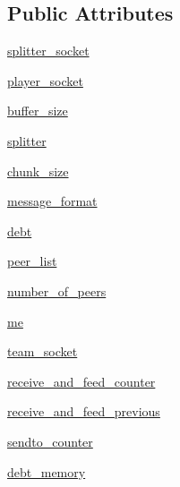 \subsection*{Public Attributes}
\begin{DoxyCompactItemize}
\item 
\hyperlink{classsrc_1_1core_1_1peer__dbs_1_1Peer__DBS_a20f9c699a4f21deb815b18b66a9f0a15}{splitter\+\_\+socket}
\item 
\hyperlink{classsrc_1_1core_1_1peer__dbs_1_1Peer__DBS_ac9c680d2156271762889ca8df74d8729}{player\+\_\+socket}
\item 
\hyperlink{classsrc_1_1core_1_1peer__dbs_1_1Peer__DBS_a40aeb00ce0d74c866a44cae0832cb627}{buffer\+\_\+size}
\item 
\hyperlink{classsrc_1_1core_1_1peer__dbs_1_1Peer__DBS_ac893e7587632b197d5867d72f8665721}{splitter}
\item 
\hyperlink{classsrc_1_1core_1_1peer__dbs_1_1Peer__DBS_a4e59f03402531dff3b8dab83a78ab1a2}{chunk\+\_\+size}
\item 
\hyperlink{classsrc_1_1core_1_1peer__dbs_1_1Peer__DBS_a35425ace8df8bc35ca5ca9d17c46b813}{message\+\_\+format}
\item 
\hyperlink{classsrc_1_1core_1_1peer__dbs_1_1Peer__DBS_a73d19818ef068e8dcb055aa16621e367}{debt}
\item 
\hyperlink{classsrc_1_1core_1_1peer__dbs_1_1Peer__DBS_a8bc92e8755ed4c4f9e4362a80a39991a}{peer\+\_\+list}
\item 
\hyperlink{classsrc_1_1core_1_1peer__dbs_1_1Peer__DBS_ae2066ca8afc595638a2f545c744c77d0}{number\+\_\+of\+\_\+peers}
\item 
\hyperlink{classsrc_1_1core_1_1peer__dbs_1_1Peer__DBS_a305a94f69a6e54994164fed3804e3068}{me}
\item 
\hyperlink{classsrc_1_1core_1_1peer__dbs_1_1Peer__DBS_acf4415c5d44af6904b83bfe873c4b0c7}{team\+\_\+socket}
\item 
\hyperlink{classsrc_1_1core_1_1peer__dbs_1_1Peer__DBS_af6d5a5c7d7e437a34367b3386172a18b}{receive\+\_\+and\+\_\+feed\+\_\+counter}
\item 
\hyperlink{classsrc_1_1core_1_1peer__dbs_1_1Peer__DBS_a89f4aab576119eec74a32db571b54c77}{receive\+\_\+and\+\_\+feed\+\_\+previous}
\item 
\hyperlink{classsrc_1_1core_1_1peer__dbs_1_1Peer__DBS_ab26d64535b00ba7488db5fcf51cdfda4}{sendto\+\_\+counter}
\item 
\hyperlink{classsrc_1_1core_1_1peer__dbs_1_1Peer__DBS_a0bf552827e8d0e698337bd89741cef27}{debt\+\_\+memory}
\end{DoxyCompactItemize}
